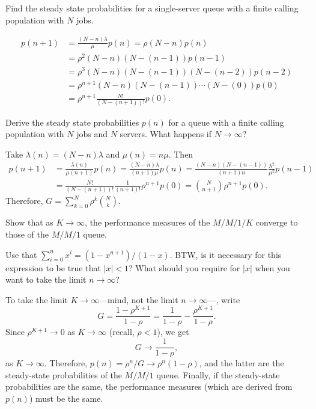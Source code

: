 \begin{exercise}\label{ex:l-247}
Find  the steady state probabilities  for a single-server queue with a finite calling population with $N$ jobs.
\begin{solution}
 \begin{align*}
 p(n+1) 
& = \frac{(N-n)\lambda}\mu p(n) 
 = \rho (N-n) p(n) \\
& = \rho^2 (N-n)(N-(n-1))p(n-1) \\
& = \rho^3 (N-n)(N-(n-1))(N-(n-2)) p(n-2) \\
& = \rho^{n+1} (N-n)(N-(n-1))\cdots(N-(0)) p(0) \\
&= \rho^{n+1} \frac{N!}{(N-(n+1))!}p(0). 
 \end{align*}
\end{solution}
\end{exercise}

\begin{exercise}\label{ex:33}
 Derive the steady state probabilities $p(n)$ for a queue with a finite calling population with $N$ jobs and $N$ servers.
  What happens if $N\to\infty$?
\begin{solution}
 Take $\lambda(n) = (N-n)\lambda$ and $\mu(n) = n \mu$. Then 
 \begin{align*}
 p(n+1) 
&= \frac{\lambda(n)}{\mu(n+1)} p(n) 
= \frac{(N-n)\lambda}{(n+1)\mu} p(n) 
= \frac{(N-n)(N-(n-1))}{(n+1)n}\frac{\lambda^2}{\mu^2} p(n-1) \\
&= \frac{N!}{(N-(n+1))!}\frac1{(n+1)!}\rho^{n+1} p(0) 
 = {N \choose n+1}\rho^{n+1} p(0).
 \end{align*}
Therefore, $G=\sum_{k=0}^N \rho^k { N \choose k}$.
\end{solution}
\end{exercise}



\begin{exercise}\label{ex:40}
 Show that as $K\to\infty$, the performance measures of the $M/M/1/K$ converge to those of the $M/M/1$ queue. 
\begin{hint}
Use that $\sum_{i=0}^n x^i = (1-x^{n+1})/(1-x)$. BTW, is it
 necessary for this expression to be true that $|x|<1$? What should
 you require for $|x|$ when you want to take the limit
 $n\to\infty$?
\end{hint}
\begin{solution}
To take the limit $K\to\infty$---mind, not the limit $n\to\infty$---, write
\begin{equation*}
G= \frac{1-\rho^{K+1}}{1-\rho} = \frac{1}{1-\rho} -\frac{\rho^{K+1}}{1-\rho}.
\end{equation*}
Since $\rho^{K+1}\to 0$ as $K\to \infty$ (recall, $\rho<1$), we get
\begin{equation*}
G \to \frac{1}{1-\rho}, 
\end{equation*}
as $K\to\infty$. Therefore, $p(n)=\rho^n/G \to \rho^n(1-\rho)$, and
the latter are the steady-state probabilities of the $M/M/1$
queue. Finally, if the steady-state probabilities are the same, the
performance measures (which are derived from $p(n)$) must be the same.
\end{solution}
\end{exercise}


